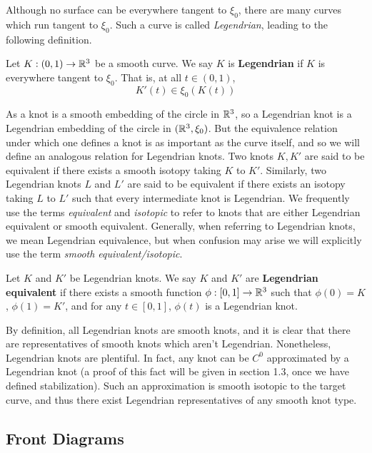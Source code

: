 Although no surface can be everywhere tangent to $\xi_0$, there are many curves which run tangent to $\xi_0$. Such a curve is called \emph{Legendrian}, leading to the following definition.

\begin{defn}
    Let $K: (0, 1) \to \mathbb{R}^3$ be a smooth curve. We say $K$ is \textbf{Legendrian} if $K$ is everywhere tangent to $\xi_0$. That is, at all $t \in (0, 1)$,
    \[
        K'(t) \in \xi_0(K(t))
    \]
\end{defn}

As a knot is a smooth embedding of the circle in $\mathbb{R}^3$, so a Legendrian knot is a Legendrian embedding of the circle in $(\mathbb{R}^3, \xi_0)$. But the equivalence relation under which one defines a knot is as important as the curve itself, and so we will define an analogous relation for Legendrian knots. Two knots $K, K'$ are said to be equivalent if there exists a smooth isotopy taking $K$ to $K'$. Similarly, two Legendrian knots $L$ and $L'$ are said to be equivalent if there exists an isotopy taking $L$ to $L'$ such that every intermediate knot is Legendrian.
We frequently use the terms \emph{equivalent} and \emph{isotopic} to refer to knots that are either Legendrian equivalent or smooth equivalent. Generally, when referring to Legendrian knots, we mean Legendrian equivalence, but when confusion may arise we will explicitly use the term \emph{smooth equivalent/isotopic}.

\begin{defn}
    Let $K$ and $K'$ be Legendrian knots. We say $K$ and $K'$ are \textbf{Legendrian equivalent} if there exists a smooth function $\phi: [0, 1] \to \mathbb{R}^3$ such that
    $\phi(0) = K$, $\phi(1) = K'$, and for any $t \in [0, 1]$, $\phi(t)$ is a Legendrian knot.
\end{defn}

By definition, all Legendrian knots are smooth knots, and it is clear that there are representatives of smooth knots which aren't Legendrian. Nonetheless, Legendrian knots are plentiful. In fact, any knot can be $C^0$ approximated by a Legendrian knot (a proof of this fact will be given in section 1.3, once we have defined stabilization).
Such an approximation is smooth isotopic to the target curve, and thus there exist Legendrian representatives of any smooth knot type.

\subsection{Front Diagrams}

